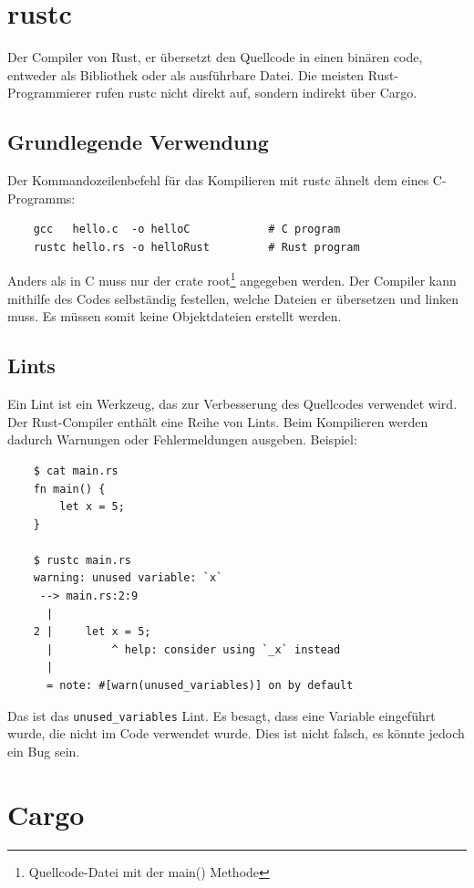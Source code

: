 \section{rustc}

Der Compiler von Rust, er übersetzt den Quellcode in einen binären code, entweder als Bibliothek oder als ausführbare Datei. Die meisten Rust-Programmierer rufen rustc nicht direkt auf, sondern indirekt über Cargo. \cite{RustcBook}

\subsection{Grundlegende Verwendung}

Der Kommandozeilenbefehl für das Kompilieren mit rustc ähnelt dem eines C-Programms:

\begin{lstlisting}
    gcc   hello.c  -o helloC            # C program
    rustc hello.rs -o helloRust         # Rust program
\end{lstlisting}

Anders als in C muss nur der crate root\footnote{Quellcode-Datei mit der main() Methode} angegeben werden. Der Compiler kann mithilfe des Codes selbständig festellen, welche Dateien er übersetzen und linken muss. Es müssen somit keine Objektdateien erstellt werden.

\subsection{Lints}

Ein Lint ist ein Werkzeug, das zur Verbesserung des Quellcodes verwendet wird. Der Rust-Compiler enthält eine Reihe von Lints. Beim Kompilieren werden dadurch Warnungen oder Fehlermeldungen ausgeben. Beispiel:

\begin{lstlisting}
    $ cat main.rs
    fn main() {
        let x = 5;
    }

    $ rustc main.rs
    warning: unused variable: `x`
     --> main.rs:2:9
      |
    2 |     let x = 5;
      |         ^ help: consider using `_x` instead
      |
      = note: #[warn(unused_variables)] on by default
\end{lstlisting}

Das ist das \verb"unused_variables" Lint. Es besagt, dass eine Variable eingeführt wurde, die nicht im Code verwendet wurde. Dies ist nicht falsch, es könnte jedoch ein Bug sein.


\section{Cargo}

